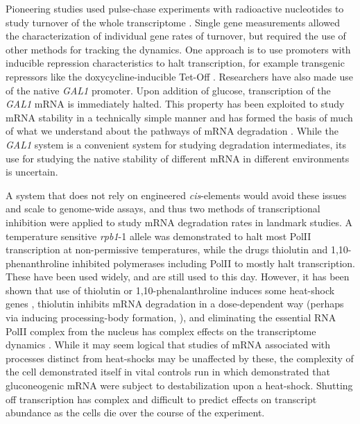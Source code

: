 Pioneering studies used pulse-chase experiments with radioactive
nucleotides to study turnover of the whole transcriptome 
\parencite{petersen1976half}.
Single gene measurements allowed the characterization of individual
gene rates of turnover, but required the use of other methods for
tracking the dynamics.
One approach is to use promoters with inducible repression
characteristics to halt transcription, for example transgenic
repressors like the doxycycline-inducible Tet-Off 
\parencite{gari1997set}.
Researchers have also made use of the native \textit{GAL1} promoter. 
Upon addition of glucose, transcription of the \textit{GAL1} mRNA is 
immediately halted. This property has been exploited to study mRNA 
stability in a technically simple manner and has formed the basis of 
much of what we understand about the pathways of mRNA degradation
\parencite{parker2012rna,coller2004eukaryotic}.
While the \textit{GAL1} system is a convenient system for studying 
degradation intermediates, its use for studying the native stability 
of different mRNA in different environments is uncertain.  

A system
that does not rely on engineered \textit{cis}-elements would avoid 
these issues and scale to genome-wide assays, and thus two methods of
transcriptional inhibition were applied to study mRNA degradation
rates in landmark studies. A temperature sensitive \textit{rpb1}-1 
allele was demonstrated to halt most PolII transcription at 
non-permissive temperatures, while the drugs thiolutin and 
1,10-phenanthroline
inhibited polymerases including PolII to mostly halt transcription.
These have been used widely, and are still used to this day. However,
it has been shown that use of thiolutin or 1,10-phenalanthroline
induces some heat-shock genes \parencite{adams1991yeast}, thiolutin
inhibits mRNA degradation in a dose-dependent way 
\parencite{pelechano2008transcriptional}
(perhaps via inducing processing-body formation,
\cite{huch2016decapping}), 
and eliminating the essential RNA PolII complex
from the nucleus has complex effects on the transcriptome dynamics 
\parencite{yu2016rna}. While it may seem logical that studies of mRNA
associated with processes distinct from heat-shocks may be unaffected
by these, the complexity of the cell demonstrated itself in vital
controls run in \cite{mercado1994levels} which demonstrated that
gluconeogenic mRNA were subject to destabilization upon a
heat-shock. Shutting off transcription has complex and difficult to
predict effects on transcript abundance as the cells die over the
course of the experiment.  

